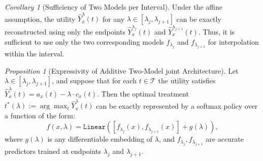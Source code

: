 \documentclass{article}
\theoremstyle{remark}
\newtheorem{proposition}{Proposition}
\newtheorem{corollary}{Corollary}
\begin{document}

\begin{corollary}[Sufficiency of Two Models per Interval]
\label{cor:two-models}
Under the affine assumption, the utility $\hat{Y}_x^\lambda(t)$ for any $\lambda \in [\lambda_j, \lambda_{j+1}]$ can be exactly reconstructed using only the endpoints $\hat{Y}_x^{\lambda_j}(t)$ and $\hat{Y}_x^{\lambda_{j+1}}(t)$. Thus, it is sufficient to use only the two corresponding models $f_{\lambda_j}$ and $f_{\lambda_{j+1}}$ for interpolation within the interval.
\end{corollary}
\begin{proposition}[Expressivity of Additive Two-Model joint Architecture]
\label{prop:architecture-expressivity}
Let $\lambda \in [\lambda_j, \lambda_{j+1}]$, and suppose that for each $t \in \mathcal{T}$ the utility satisfies $\hat{Y}_x^\lambda(t) = a_x(t) - \lambda \cdot c_x(t)$. Then the optimal treatment $t^*(\lambda) := \arg\max_{t} \hat{Y}_x^\lambda(t)$ can be exactly represented by a softmax policy over a function of the form:
\[
f(x, \lambda) = \texttt{Linear} \left( [f_{\lambda_j}(x), f_{\lambda_{j+1}}(x)] + g(\lambda) \right),
\]
where $g(\lambda)$ is any differentiable embedding of $\lambda$, and $f_{\lambda_j}, f_{\lambda_{j+1}}$ are accurate predictors trained at endpoints $\lambda_j$ and $\lambda_{j+1}$.
\end{proposition}


\end{document}
